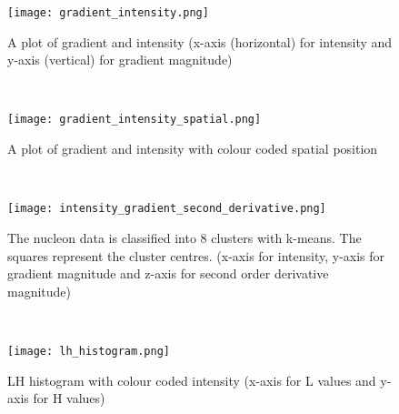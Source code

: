 \begin{figure}
	\centering
	\begin{minipage}{.24\textwidth}
		\centering
		\texttt{[image: gradient\_intensity.png]}
		\caption{A plot of gradient and intensity (x-axis (horizontal) for intensity and y-axis (vertical) for gradient magnitude)}
		\label{fig:gradient_intensity}
	\end{minipage}~
	~ %
	\begin{minipage}{.24\textwidth}
		\centering
		\texttt{[image: gradient\_intensity\_spatial.png]}
		\caption{A plot of gradient and intensity with colour coded spatial position}
		\label{fig:gradient_intensity_spatial}
	\end{minipage}~
	\begin{minipage}{.24\textwidth}
		\centering
		\texttt{[image: intensity\_gradient\_second\_derivative.png]}
		\caption{The nucleon data is classified into 8 clusters with k-means. The squares represent the cluster centres. (x-axis for intensity, y-axis for gradient magnitude and z-axis for second order derivative magnitude)}
		\label{fig:intensity_gradient_second_derivative}
	\end{minipage}~
	\begin{minipage}{.24\textwidth}
		\centering
		\texttt{[image: lh\_histogram.png]}
		\caption{LH histogram with colour coded intensity (x-axis for L values and y-axis for H values)}
		\label{fig:lh_histogram}
	\end{minipage}
\end{figure}


